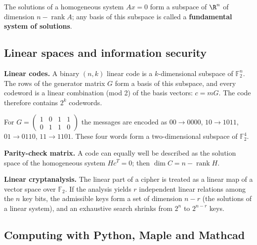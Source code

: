 \begin{teorema}
The solutions of a homogeneous system $Ax=0$ form a subspace of $\R^n$ of
dimension $n-\operatorname{rank}A$; any basis of this subspace is called a
\textbf{fundamental system of solutions}.
\end{teorema}

\subsection{Linear spaces and information security}

\textbf{Linear codes.} A binary $(n,k)$ linear code is a $k$-dimensional
subspace of $\mathbb F_2^n$. The rows of the generator matrix $G$ form a basis
of this subspace, and every codeword is a linear combination (mod 2) of the
basis vectors: $c=mG$. The code therefore contains $2^k$ codewords.

\begin{misol}
For $G=\left(\begin{smallmatrix}1&0&1&1\\0&1&1&0\end{smallmatrix}\right)$ the
messages are encoded as $00\to0000$, $10\to1011$, $01\to0110$, $11\to1101$.
These four words form a two-dimensional subspace of $\mathbb F_2^4$.
\end{misol}

\textbf{Parity-check matrix.} A code can equally well be described as the
solution space of the homogeneous system $Hc^T=0$; then
$\dim C=n-\operatorname{rank}H$.

\textbf{Linear cryptanalysis.} The linear part of a cipher is treated as a
linear map of a vector space over $\mathbb F_2$. If the analysis yields $r$
independent linear relations among the $n$ key bits, the admissible keys form
a set of dimension $n-r$ (the solutions of a linear system), and an exhaustive
search shrinks from $2^n$ to $2^{n-r}$ keys.

\subsection{Computing with Python, Maple and Mathcad}

